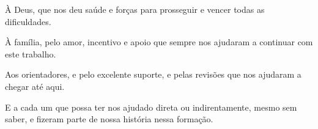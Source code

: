 \begin{agradecimentos}

À Deus, que nos deu saúde e forças para prosseguir e vencer todas as dificuldades.

À família, pelo amor, incentivo e apoio que sempre nos ajudaram a continuar com este trabalho.

Aos orientadores, {\imprimirorientador} e {\imprimircoorientador} pelo excelente suporte, e pelas revisões que nos ajudaram a chegar até aqui.

E a cada um que possa ter nos ajudado direta ou indirentamente, mesmo sem saber, e fizeram parte de nossa história nessa formação.

\end{agradecimentos}

